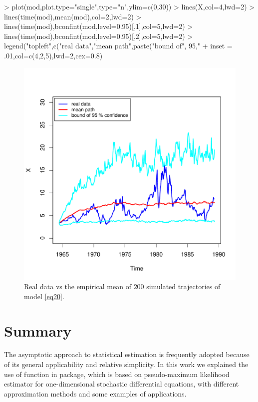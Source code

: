\begin{Schunk}
\begin{Sinput}
> plot(mod,plot.type="single",type="n",ylim=c(0,30))
> lines(X,col=4,lwd=2)
> lines(time(mod),mean(mod),col=2,lwd=2)
> lines(time(mod),bconfint(mod,level=0.95)[,1],col=5,lwd=2)
> lines(time(mod),bconfint(mod,level=0.95)[,2],col=5,lwd=2)
> legend("topleft",c("real data","mean path",paste("bound of", 95,"%
+        inset = .01,col=c(4,2,5),lwd=2,cex=0.8)
\end{Sinput}
\end{Schunk}
\begin{figure}[!ht]
\begin{center}
\includegraphics{FitSDE-026}
\end{center}
\caption{Real data vs the empirical mean of $200$ simulated trajectories of model \eqref{eq20}.}\label{fig2}
\end{figure}

\section{Summary}
The asymptotic approach to statistical estimation is frequently adopted because of its general applicability and relative simplicity. In this work we explained the use of  function in  package, which is based on pseudo-maximum likelihood estimator for one-dimensional stochastic differential equations, with different approximation methods and some examples of applications.



